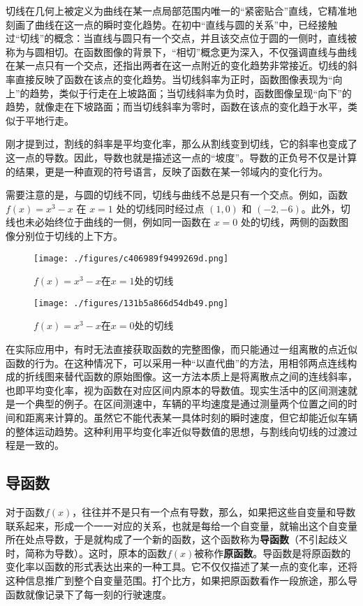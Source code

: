 切线在几何上被定义为曲线在某一点局部范围内唯一的“紧密贴合”直线，它精准地刻画了曲线在这一点的瞬时变化趋势。在初中“直线与圆的关系”中，已经接触过“切线”的概念：当直线与圆只有一个交点，并且该交点位于圆的一侧时，直线被称为与圆相切。在函数图像的背景下，“相切”概念更为深入，不仅强调直线与曲线在某一点只有一个交点，还指出两者在这一点附近的变化趋势非常接近。切线的斜率直接反映了函数在该点的变化趋势。当切线斜率为正时，函数图像表现为“向上”的趋势，类似于行走在上坡路面；当切线斜率为负时，函数图像呈现“向下”的趋势，就像走在下坡路面；而当切线斜率为零时，函数在该点的变化趋于水平，类似于平地行走。

刚才提到过，割线的斜率是平均变化率，那么从割线变到切线，它的斜率也变成了这一点的导数。因此，导数也就是描述这一点的“坡度”。导数的正负号不仅是计算的结果，更是一种直观的符号语言，反映了函数在某一邻域内的变化行为。

需要注意的是，与圆的切线不同，切线与曲线不总是只有一个交点。例如，函数 $f(x) = x^3 - x$ 在 $x = 1$ 处的切线同时经过点 $(1, 0)$ 和 $(-2, -6)$。此外，切线也未必始终位于曲线的一侧，例如同一函数在 $x = 0$ 处的切线，两侧的函数图像分别位于切线的上下方。

\begin{figure}[ht]
\centering
\texttt{[image: ./figures/c406989f9499269d.png]}
\caption{$f(x)=x^3-x$在$x=1$处的切线} \label{fig_HsDerv_1}
\end{figure}

\begin{figure}[ht]
\centering
\texttt{[image: ./figures/131b5a866d54db49.png]}
\caption{$f(x)=x^3-x$在$x=0$处的切线} \label{fig_HsDerv_2}
\end{figure}

在实际应用中，有时无法直接获取函数的完整图像，而只能通过一组离散的点近似函数的行为。在这种情况下，可以采用一种“以直代曲”的方法，用相邻两点连线构成的折线图来替代函数的原始图像。这一方法本质上是将离散点之间的连线斜率，也即平均变化率，视为函数在对应区间内原本的导数值。现实生活中的区间测速就是一个典型的例子。在区间测速中，车辆的平均速度是通过测量两个位置之间的时间和距离来计算的。虽然它不能代表某一具体时刻的瞬时速度，但它却能近似车辆的整体运动趋势。这种利用平均变化率近似导数值的思想，与割线向切线的过渡过程是一致的。

\subsection{导函数}

对于函数$f(x)$，往往并不是只有一个点有导数，那么，如果把这些自变量和导数联系起来，形成一个一一对应的关系，也就是每给一个自变量，就输出这个自变量所在处点导数，于是就构成了一个新的函数，这个函数称为\textbf{导函数}（不引起歧义时，简称为导数）。这时，原本的函数$f(x)$被称作\textbf{原函数}。导函数是将原函数的变化率以函数的形式表达出来的一种工具。它不仅仅描述了某一点的变化率，还将这种信息推广到整个自变量范围。打个比方，如果把原函数看作一段旅途，那么导函数就像记录下了每一刻的行驶速度。


